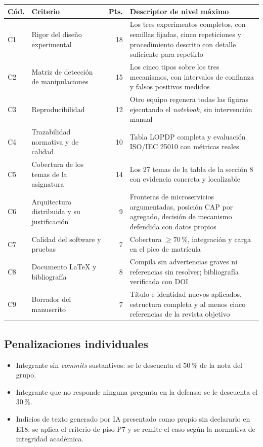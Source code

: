 \documentclass[11pt,a4paper]{article}
\begin{document}
\begin{center}
	\small
	\begin{longtable}{@{}p{0.9cm}p{5.6cm}rp{6.6cm}@{}}
		\toprule
		\textbf{Cód.} & \textbf{Criterio} & \textbf{Pts.} & \textbf{Descriptor de nivel máximo} \\
		\midrule
		\endhead
		C1 & Rigor del diseño experimental & 18 & Los tres experimentos completos, con semillas fijadas, cinco repeticiones y procedimiento descrito con detalle suficiente para repetirlo \\
		\addlinespace
		C2 & Matriz de detección de manipulaciones & 15 & Los cinco tipos sobre los tres mecanismos, con intervalos de confianza y falsos positivos medidos \\
		\addlinespace
		C3 & Reproducibilidad & 12 & Otro equipo regenera todas las figuras ejecutando el \emph{notebook}, sin intervención manual \\
		\addlinespace
		C4 & Trazabilidad normativa y de calidad & 10 & Tabla LOPDP completa y evaluación ISO/IEC 25010 con métricas reales \\
		\addlinespace
		C5 & Cobertura de los temas de la asignatura & 14 & Los 27 temas de la tabla de la sección 8 con evidencia concreta y localizable \\
		\addlinespace
		C6 & Arquitectura distribuida y su justificación & 9 & Fronteras de microservicios argumentadas, posición CAP por agregado, decisión de mecanismo defendida con datos propios \\
		\addlinespace
		C7 & Calidad del software y pruebas & 7 & Cobertura $\geq 70\,\%$, integración y carga en el pico de matrícula \\
		\addlinespace
		C8 & Documento LaTeX y bibliografía & 8 & Compila sin advertencias graves ni referencias sin resolver; bibliografía verificada con DOI \\
		\addlinespace
		C9 & Borrador del manuscrito & 7 & Título e identidad nuevos aplicados, estructura completa y al menos cinco referencias de la revista objetivo \\
		\bottomrule
	\end{longtable}
\end{center}

\subsection{Penalizaciones individuales}

\begin{itemize}[leftmargin=*,itemsep=3pt]
	\item Integrante sin \emph{commits} sustantivos: se le descuenta el 50\,\% de la nota del grupo.
	\item Integrante que no responde ninguna pregunta en la defensa: se le descuenta el 30\,\%.
	\item Indicios de texto generado por IA presentado como propio sin declararlo en E18: se aplica el criterio de piso P7 y se remite el caso según la normativa de integridad académica.
\end{itemize}
\end{document}
